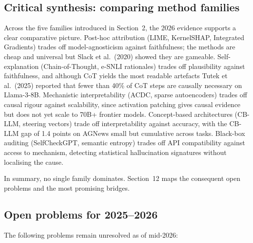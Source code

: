 \documentclass{article}
\begin{document}
\subsection{Critical synthesis: comparing method families}\label{critical-synthesis-comparing-method-families}

Across the five families introduced in Section~2, the 2026 evidence supports a clear comparative picture. Post-hoc attribution (LIME, KernelSHAP, Integrated Gradients) trades off model-agnosticism against faithfulness; the methods are cheap and universal but Slack et al.~(2020) showed they are gameable. Self-explanation (Chain-of-Thought, e-SNLI rationales) trades off plausibility against faithfulness, and although CoT yields the most readable artefacts Tutek et al.~(2025) reported that fewer than 40\% of CoT steps are causally necessary on Llama-3-8B. Mechanistic interpretability (ACDC, sparse autoencoders) trades off causal rigour against scalability, since activation patching gives causal evidence but does not yet scale to 70B+ frontier models. Concept-based architectures (CB-LLM, steering vectors) trade off interpretability against accuracy, with the CB-LLM gap of 1.4 points on AGNews small but cumulative across tasks. Black-box auditing (SelfCheckGPT, semantic entropy) trades off API compatibility against access to mechanism, detecting statistical hallucination signatures without localising the cause.

In summary, no single family dominates. Section~12 maps the consequent open problems and the most promising bridges.

\subsection{Open problems for 2025--2026}\label{open-problems-for-20252026}

The following problems remain unresolved as of mid-2026:
\end{document}
